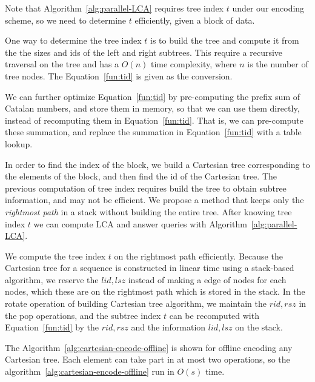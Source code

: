 Note that Algorithm~\ref{alg:parallel-LCA} requires tree index $t$
under our encoding scheme, so we need to determine $t$ efficiently,
given a block of data.


One way to determine the tree index $t$ is to build the tree and compute
it from the the sizes and ids of the left and right subtrees. This
require a recursive traversal on the tree and has a $O(n)$ time
complexity, where $n$ is the number of tree nodes.  The
Equation~\ref{fun:tid} is given as the conversion.

% 



We can further optimize Equation~\ref{fun:tid} by pre-computing the
prefix sum of Catalan numbers, and store them in memory, so that we can
use them directly, instead of recomputing them in
Equation~\ref{fun:tid}.  That is, we can pre-compute these summation,
and replace the summation in Equation~\ref{fun:tid} with a table lookup.


In order to find the index of the block, we build a Cartesian tree
corresponding to the elements of the block, and then find the id of the
Cartesian tree. The previous computation of tree index requires build
the tree to obtain subtree information, and may not be efficient.  We
propose a method that keeps only the {\em rightmost path} in a stack
without building the entire tree.  After knowing tree index $t$ we can
compute LCA and answer queries with Algorithm~\ref{alg:parallel-LCA}.

We compute the tree index $t$ on the rightmost path efficiently. Because
the Cartesian tree for a sequence is constructed in linear time using a
stack-based algorithm, we reserve the $\mathit{lid}, \mathit{lsz}$
instead of making a edge of nodes for each nodes, which these are on the
rightmost path which is stored in the stack.  In the rotate operation of
building Cartesian tree algorithm, we maintain the $\mathit{rid},
\mathit{rsz}$ in the pop operations, and the subtree index $t$ can be
recomputed with Equation~\ref{fun:tid} by the $\mathit{rid},
\mathit{rsz}$ and the information $\mathit{lid}, \mathit{lsz}$ on the
stack.

The Algorithm~\ref{alg:cartesian-encode-offline} is shown for offline
encoding any Cartesian tree.  Each element can take part in at most two
operations, so the algorithm~\ref{alg:cartesian-encode-offline} run in
$O(s)$ time.

